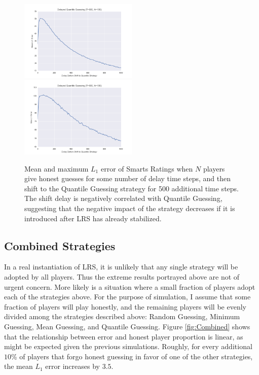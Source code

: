\begin{figure}[h]
\centerline{%
\includegraphics[width=0.5\textwidth]{figures/robustness/Delayed_Quantile_Guessing41.png}%
\includegraphics[width=0.5\textwidth] {figures/robustness/Delayed_Quantile_Guessing42.png}%
}%
\caption{Mean and maximum $L_1$ error of Smarts Ratings when $N$ players give honest guesses for some number of delay time steps, and then shift to the Quantile Guessing strategy for 500 additional time steps. The shift delay is negatively correlated with Quantile Guessing, suggesting that the negative impact of the strategy decreases if it is introduced after LRS has already stabilized.}
\label{fig:QuantileGuessDelay}
\end{figure}

\subsection{Combined Strategies}

In a real instantiation of LRS, it is unlikely that any single strategy will be adopted by all players. Thus the extreme results portrayed above are not of urgent concern. More likely is a situation where a small fraction of players adopt each of the strategies above. For the purpose of simulation, I assume that some fraction of players will play honestly, and the remaining players will be evenly divided among the strategies described above: Random Guessing, Minimum Guessing, Mean Guessing, and Quantile Guessing. Figure \ref{fig:Combined} shows that the relationship between error and honest player proportion is linear, as might be expected given the previous simulations. Roughly, for every additional $10$\% of players that forgo honest guessing in favor of one of the other strategies, the mean $L_1$ error increases by $3.5$.

